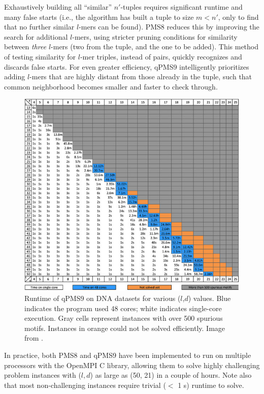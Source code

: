 \documentclass[oneside,12pt]{DISCSthesis}
\begin{document}
		\noindent Exhaustively building all ``similar'' $n'$-tuples requires significant runtime and many false starts (i.e., the algorithm has built a tuple to size $m < n'$, only to find that no further similar $l$-mers can be found).
		PMS8 reduces this by improving the search for additional $l$-mers, using stricter pruning conditions for similarity %
		between {\em three} $l$-mers (two from the tuple, and the one to be added). This method of testing similarity for $l$-mer triples, instead of pairs, quickly recognizes and discards false starts. For even greater efficiency, qPMS9 intelligently prioritizes adding $l$-mers that are highly distant from those already in the tuple, such that common neighborhood becomes smaller and faster to check through.

			\begin{figure}[ht] \label{fig:qpms9}
				\centering
				\includegraphics[width=5.3in]{img/qpms9}
				\caption{Runtime of qPMS9 on DNA datasets for various ($l$,$d$) values. Blue indicates the program used 48 cores; white indicates single-core execution. Gray cells represent instances with over 500 spurious motifs. Instances in orange could not be solved efficiently. Image from \cite{pms2015}.}
				\end{figure}

		\vspace*{2mm}
		\noindent In practice, both PMS8 and qPMS9 have been implemented to run on multiple processors with the OpenMPI C library, allowing them to solve highly challenging problem instances with ($l, d$) as large as (50, 21) in a couple of hours. Note also that most non-challenging instances require trivial ($<$ 1 s) runtime to solve.
\end{document}
